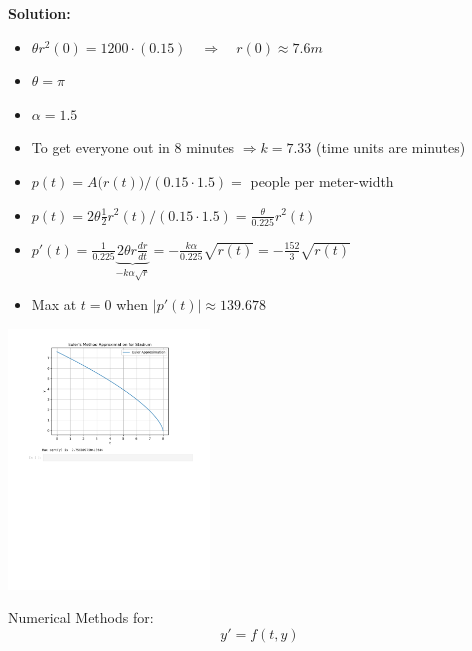 \documentclass{workbook}
\begin{document}
\begin{solution}
\begin{slide}

\textbf{Solution:}

\begin{itemize}
\item $\theta r^2(0) = 1200 \cdot (0.15) \quad \Rightarrow \quad r(0) \approx 7.6m$
\item $\theta = \pi$
\item $\alpha = 1.5$
\item To get everyone out in 8 minutes $\Rightarrow k = 7.33$ (time units are minutes)
\item $p(t) = A\big(r(t)\big)/(0.15\cdot 1.5) = $ people per meter-width
\item $p(t) = 2\theta \frac12 r^2(t)/(0.15\cdot 1.5) = \frac{\theta}{0.225} r^2(t)$
\item $\displaystyle p'(t) = \frac{1}{0.225} \underbrace{2 \theta r\frac{dr}{dt}}_{- k \alpha \sqrt{r}} = -\frac{k \alpha}{0.225} \sqrt{r(t)} = - \frac{152}{3} \sqrt{r(t)}$ 
\item Max at $t=0$ when $|p'(t)| \approx 139.678$
\end{itemize}

\includegraphics[width=0.4\textwidth]{python/Stadium-Euler-ipynb.pdf}
	
\end{slide}	
\end{solution}





\begin{slide}

\question

Numerical Methods for:
\[ y' = f(t,y) \]



\end{slide}
\end{document}
